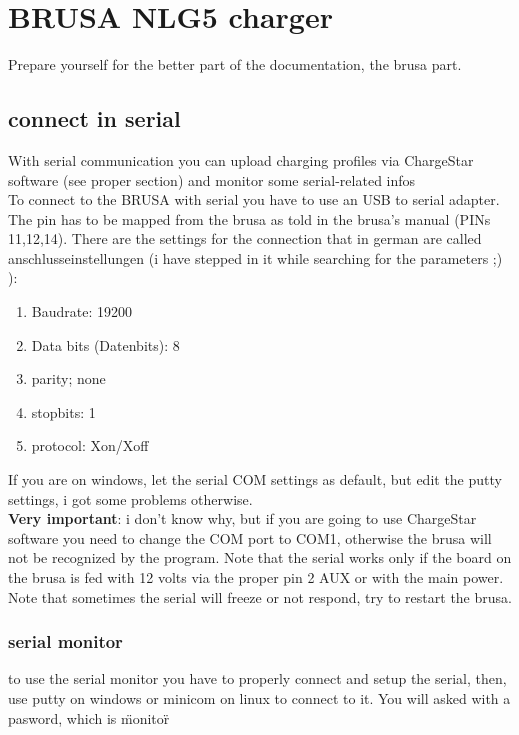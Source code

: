 \documentclass[a4paper]{report}
\begin{document}
  \chapter{BRUSA NLG5 charger}
  Prepare yourself for the better part of the documentation, the brusa part.
  \section{connect in serial}
  With serial communication you can upload charging profiles via ChargeStar software (see proper section) and monitor some serial-related infos\\
  To connect to the BRUSA with serial you have to use an USB to serial adapter. The pin has to be mapped from the brusa as told in the brusa's manual (PINs 11,12,14). There are the settings for the connection that in german are called anschlusseinstellungen (i have stepped in it while searching for the parameters ;) ):
  \begin{enumerate}
    \item Baudrate: 19200
    \item Data bits (Datenbits): 8
    \item parity; none
    \item stopbits: 1
    \item protocol: Xon/Xoff
  \end{enumerate}
  If you are on windows, let the serial COM settings as default, but edit the putty settings, i got some problems otherwise.\\
  \textbf{Very important}: i don't know why, but if you are going to use ChargeStar software you need to change the COM port to COM1, otherwise the brusa will not be recognized by the program.
  Note that the serial works only if the board on the brusa is fed with 12 volts via the proper pin 2 AUX or with the main power.\\
  Note that sometimes the serial will freeze or not respond, try to restart the brusa.

  \subsection{serial monitor}
  to use the serial monitor you have to properly connect and setup the serial, then, use putty on windows or minicom on linux to connect to it. You will asked with a pasword, which is \"monitor\"
\end{document}
